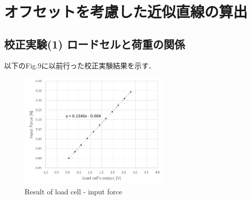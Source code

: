\documentclass[twocolumn,a4j]{jsarticle}
\begin{document}
\newpage

\section{オフセットを考慮した近似直線の算出}

\subsection{校正実験(1) ロードセルと荷重の関係}
以下のFig.9に以前行った校正実験結果を示す．
\begin{figure}[htbp]
    \footnotesize
    \begin{center}
        \includegraphics[width=72mm]{../images/calibration_1.png}
        \caption{Result of load cell - input force}
    \end{center}
\end{figure}
\end{document}
